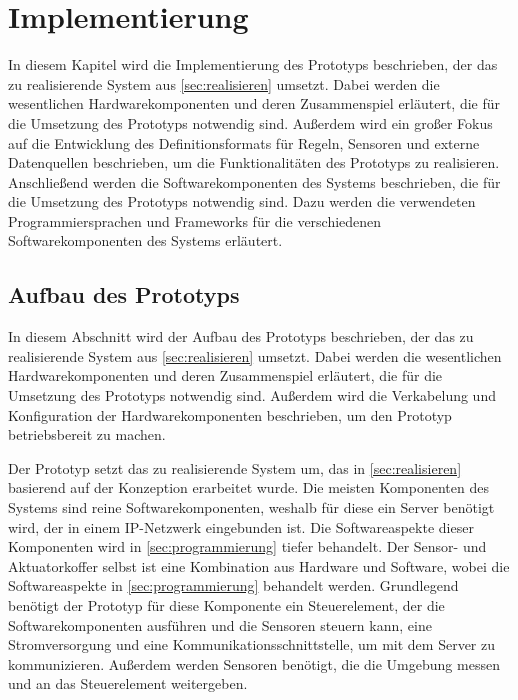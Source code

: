 \chapter{Implementierung}\label{ch:implementierung}
In diesem Kapitel wird die Implementierung des Prototyps beschrieben, der das zu realisierende System aus \cref{sec:realisieren} umsetzt.
Dabei werden die wesentlichen Hardwarekomponenten und deren Zusammenspiel erläutert, die für die Umsetzung des Prototyps notwendig sind.
Außerdem wird ein großer Fokus auf die Entwicklung des Definitionsformats für Regeln, Sensoren und externe Datenquellen beschrieben, um die Funktionalitäten des Prototyps zu realisieren.
Anschließend werden die Softwarekomponenten des Systems beschrieben, die für die Umsetzung des Prototyps notwendig sind.
Dazu werden die verwendeten Programmiersprachen und Frameworks für die verschiedenen Softwarekomponenten des Systems erläutert.



\section{Aufbau des Prototyps}
In diesem Abschnitt wird der Aufbau des Prototyps beschrieben, der das zu realisierende System aus \cref{sec:realisieren} umsetzt.
Dabei werden die wesentlichen Hardwarekomponenten und deren Zusammenspiel erläutert, die für die Umsetzung des Prototyps notwendig sind.
Außerdem wird die Verkabelung und Konfiguration der Hardwarekomponenten beschrieben, um den Prototyp betriebsbereit zu machen.

Der Prototyp setzt das zu realisierende System um, das in \cref{sec:realisieren} basierend auf der Konzeption erarbeitet wurde.
Die meisten Komponenten des Systems sind reine Softwarekomponenten, weshalb für diese ein Server benötigt wird, der in einem IP-Netzwerk eingebunden ist.
Die Softwareaspekte dieser Komponenten wird in \cref{sec:programmierung} tiefer behandelt.
Der Sensor- und Aktuatorkoffer selbst ist eine Kombination aus Hardware und Software, wobei die Softwareaspekte in \cref{sec:programmierung} behandelt werden.
Grundlegend benötigt der Prototyp für diese Komponente ein Steuerelement, der die Softwarekomponenten ausführen und die Sensoren steuern kann, eine Stromversorgung und eine Kommunikationsschnittstelle, um mit dem Server zu kommunizieren.
Außerdem werden Sensoren benötigt, die die Umgebung messen und an das Steuerelement weitergeben.

